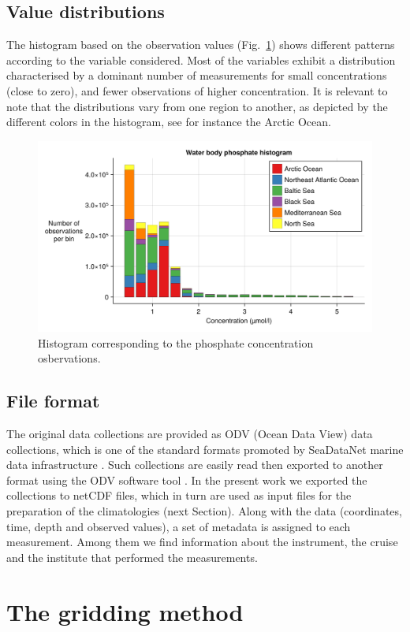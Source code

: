 \documentclass[essd,manuscript]{copernicus}
\begin{document}
\subsection{Value distributions}

The histogram based on the observation values (Fig.~\ref{fig:histogram_value_Water_body_phosphate}) shows different patterns according to the variable considered. Most of the variables exhibit a distribution characterised by a dominant number of measurements for small concentrations (close to zero), and fewer observations of higher concentration. It is relevant to note that the distributions vary from one region to another, as depicted by the different colors in the histogram, see for instance the Arctic Ocean.

\begin{figure}[t]
\centering
\includegraphics[width=.5\textwidth]{histogram_value_Water_body_phosphate.png}
\caption{Histogram corresponding to the phosphate concentration osbervations.\label{fig:histogram_value_Water_body_phosphate}}
\end{figure}


\subsection{File format}

The original data collections are provided as ODV (Ocean Data View) data collections, which is one of the standard formats promoted by SeaDataNet marine data infrastructure \citep{Lowry2023}. Such collections are easily read then exported to another format using the ODV software tool \citep{SCHLITZER2002}. In the present work we exported the collections to netCDF files, which in turn are used as input files for the preparation of the climatologies (next Section). Along with the data (coordinates, time, depth and observed values), a set of metadata is assigned to each measurement. Among them we find information about the instrument, the cruise and the institute that performed the measurements. 

\section{The gridding method\label{sec:method}}
\end{document}
